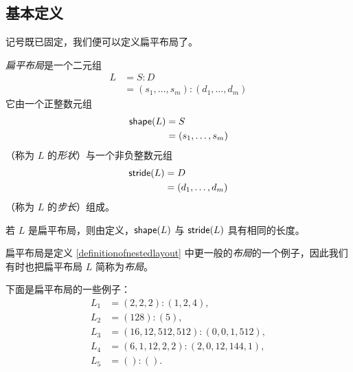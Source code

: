 \subsection{基本定义}

记号既已固定，我们便可以定义扁平布局了。

\begin{definition}\label{definitionofflatlayout}
    {\it 扁平布局}是一个二元组
    \begin{align*}
        L & = S:D \\
        & = (s_1,\dots,s_m):(d_1,\dots,d_m)
    \end{align*}
    它由一个正整数元组
    \begin{align*}
        \mathsf{shape}(L) & = S\\
        & =(s_1,\dots,s_m)
    \end{align*}
    （称为 $L$ 的{\it 形状}）与一个非负整数元组
    \begin{align*}
        \mathsf{stride}(L) & = D\\
        & = (d_1,\dots,d_m)
    \end{align*}
    （称为 $L$ 的{\it 步长}）组成。
\end{definition}

\begin{remark}
    若 $L$ 是扁平布局，则由定义，$\mathsf{shape}(L)$ 与 $\mathsf{stride}(L)$ 具有相同的长度。
\end{remark}

\begin{remark}
    扁平布局是定义 \ref{definitionofnestedlayout} 中更一般的{\it 布局}的一个例子，因此我们有时也把扁平布局 $L$ 简称为{\it 布局}。
\end{remark}

\begin{example}
    下面是扁平布局的一些例子：
    \begin{align*}
    L_1 & = (2,2,2):(1,2,4),\\
    L_2 & = (128):(5),\\
    L_3 & = (16,12,512,512):(0,0,1,512),\\
    L_4 & = (6,1,12,2,2):(2,0,12,144,1),\\
    L_5 & = () : ().
    \end{align*}
\end{example}


